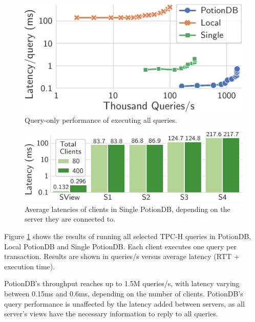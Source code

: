 \documentclass[sigconf, nonacm]{acmart}
\begin{document}
\begin{figure}
	\centering
	\includegraphics[width=0.6\linewidth]{singleQuery/all_queries_tc}
	\vspace*{-0.75em}
	\caption{Query-only performance of executing all queries.}
	\label{fig:global_local_single_tc}
	\vspace*{-0.9em}
\end{figure}%
\begin{figure}
	\centering
	\includegraphics[width=0.72\linewidth]{singleQuery/single_TC_latencies}
	\vspace*{-0.6em}
	\caption{Average latencies of clients in Single PotionDB, depending on the server they are connected to.}
	\label{fig:single_tc_latencies}
	\vspace*{-0.9em}
\end{figure}%

Figure \ref{fig:global_local_single_tc} shows the results of running all selected TPC-H queries in PotionDB, Local PotionDB and Single PotionDB.
Each client executes one query per transaction.
Results are shown in queries/s versus average latency (RTT + execution time).

PotionDB's throughput reaches up to 1.5M queries/s, with latency varying between 0.15ms and 0.6ms, depending on the number of clients.
PotionDB's query performance is unaffected by the latency added between servers, as all server's views have the necessary information to reply to all queries.
\end{document}
